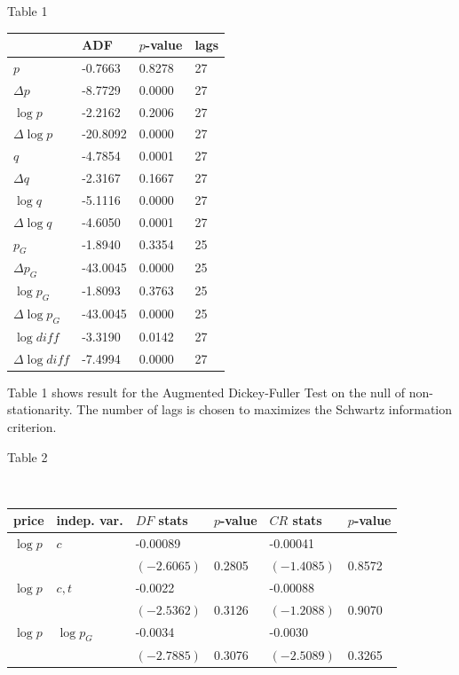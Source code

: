 \documentclass{article}
\begin{document}
\bigskip

\pagebreak

\bigskip

\begin{center}
{\Large Table 1}\bigskip

\begin{tabular}{|l|l|l|l|}
\hline
& ADF & $p$-value & lags \\ \hline
$p$ & -0.7663 & 0.8278 & 27 \\ \hline
$\Delta p$ & -8.7729 & 0.0000 & 27 \\ \hline
$\log p$ & -2.2162 & 0.2006 & 27 \\ \hline
$\Delta \log p$ & -20.8092 & 0.0000 & 27 \\ \hline
$q$ & -4.7854 & 0.0001 & 27 \\ \hline
$\Delta q$ & -2.3167 & 0.1667 & 27 \\ \hline
$\log q$ & -5.1116 & 0.0000 & 27 \\ \hline
$\Delta \log q$ & -4.6050 & 0.0001 & 27 \\ \hline
$p_{G}$ & -1.8940 & 0.3354 & 25 \\ \hline
$\Delta p_{G}$ & -43.0045 & 0.0000 & 25 \\ \hline
$\log p_{G}$ & -1.8093 & 0.3763 & 25 \\ \hline
$\Delta \log p_{G}$ & -43.0045 & 0.0000 & 25 \\ \hline
$\log diff$ & -3.3190 & 0.0142 & 27 \\ \hline
$\Delta \log diff$ & -7.4994 & 0.0000 & 27 \\ \hline
\end{tabular}%
\medskip

{\small Table 1 shows result for the Augmented Dickey-Fuller Test on the
null of non-stationarity. The number of lags is chosen to maximizes the
Schwartz information criterion.}

\bigskip

\bigskip

{\Large Table 2}

\bigskip

\
\begin{tabular}{|l|l|l|l|l|l|}
\hline
price & indep. var. & $DF$ stats & $p$-value & $CR$ stats & $p$-value \\
\hline
$\log p$ & $c$ & -0.00089 & & -0.00041 & \\ \hline
& & $\left( -2.6065\right)$ & 0.2805 & $\left( -1.4085\right)$ & 0.8572
\\ \hline
$\log p$ & $c,t$ & -0.0022 & & -0.00088 & \\ \hline
& & $\left( -2.5362\right)$ & 0.3126 & $\left( -1.2088\right)$ & 0.9070
\\ \hline
$\log p$ & $\log p_{G}$ & -0.0034 & & -0.0030 & \\ \hline
& & $\left( -2.7885\right)$ & 0.3076 & $\left( -2.5089\right)$ & 0.3265
\\ \hline
\end{tabular}%
\medskip


\end{center}
\end{document}
